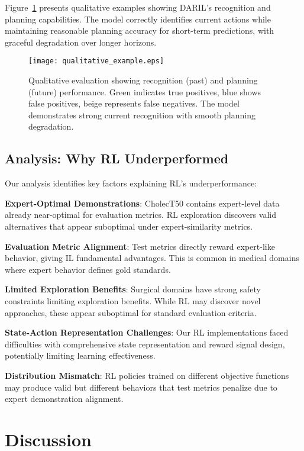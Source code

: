 \documentclass[runningheads]{llncs}
\begin{document}
Figure~\ref{fig:qualitative} presents qualitative examples showing DARIL's recognition and planning capabilities. The model correctly identifies current actions while maintaining reasonable planning accuracy for short-term predictions, with graceful degradation over longer horizons.

\begin{figure}[h]
\centering
\texttt{[image: qualitative\_example.eps]}
\caption{Qualitative evaluation showing recognition (past) and planning (future) performance. Green indicates true positives, blue shows false positives, beige represents false negatives. The model demonstrates strong current recognition with smooth planning degradation.}
\label{fig:qualitative}
\end{figure}

\subsection{Analysis: Why RL Underperformed}

Our analysis identifies key factors explaining RL's underperformance:

\textbf{Expert-Optimal Demonstrations}: CholecT50 contains expert-level data already near-optimal for evaluation metrics. RL exploration discovers valid alternatives that appear suboptimal under expert-similarity metrics.

\textbf{Evaluation Metric Alignment}: Test metrics directly reward expert-like behavior, giving IL fundamental advantages. This is common in medical domains where expert behavior defines gold standards.

\textbf{Limited Exploration Benefits}: Surgical domains have strong safety constraints limiting exploration benefits. While RL may discover novel approaches, these appear suboptimal for standard evaluation criteria.

\textbf{State-Action Representation Challenges}: Our RL implementations faced difficulties with comprehensive state representation and reward signal design, potentially limiting learning effectiveness.

\textbf{Distribution Mismatch}: RL policies trained on different objective functions may produce valid but different behaviors that test metrics penalize due to expert demonstration alignment.

\section{Discussion}
\end{document}
